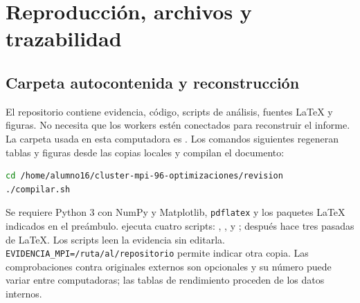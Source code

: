 \section{Reproducción, archivos y trazabilidad}\label{sec:repro}

\subsection{Carpeta autocontenida y reconstrucción}

El repositorio contiene evidencia, código, scripts de análisis, fuentes LaTeX y figuras. No necesita que los workers estén conectados para reconstruir el informe. La carpeta usada en esta computadora es . Los comandos siguientes regeneran tablas y figuras desde las copias locales y compilan el documento:

\begin{lstlisting}[language=bash]
cd /home/alumno16/cluster-mpi-96-optimizaciones/revision
./compilar.sh
\end{lstlisting}

Se requiere Python 3 con NumPy y Matplotlib, \texttt{pdflatex} y los paquetes LaTeX indicados en el preámbulo.  ejecuta cuatro scripts: , ,  y ; después hace tres pasadas de LaTeX. Los scripts leen la evidencia sin editarla. \texttt{EVIDENCIA\_MPI=/ruta/al/repositorio} permite indicar otra copia. Las comprobaciones contra originales externos son opcionales y su número puede variar entre computadoras; las tablas de rendimiento proceden de los datos internos.

